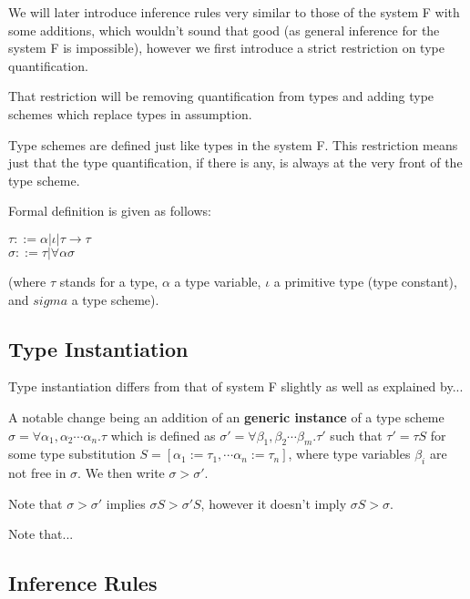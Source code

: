 We will later introduce inference rules very similar to those of the system F with some additions, which wouldn't sound that good (as general inference for the system F is impossible), however we first introduce a strict restriction on type quantification.

That restriction will be removing quantification from types and adding type schemes which replace types in assumption.

Type schemes are defined just like types in the system F. This restriction means just that the type quantification, if there is any, is always at the very front of the type scheme.

Formal definition is given as follows:

$\tau ::= \alpha | \iota | \tau \rightarrow \tau$ \\
$\sigma ::= \tau | \forall \alpha \sigma$

(where $\tau$ stands for a type, $\alpha$ a type variable, $\iota$ a primitive type (type constant), and $sigma$ a type scheme). %

\subsection{Type Instantiation}

Type instantiation differs from that of system F slightly as well as explained  by... %

A notable change being an addition of an \textbf{generic instance} of a type scheme $\sigma = \forall \alpha_1, \alpha_2 \cdots \alpha_n . \tau$ which is defined as $\sigma' = \forall \beta_1, \beta_2 \cdots \beta_m . \tau'$ such that
$\tau' = \tau S$ for some type substitution $S = [\alpha_1 := \tau_1, \cdots \alpha_n := \tau_n]$, where type variables $\beta_i$ are not free in $\sigma$. We then write $\sigma > \sigma'$.

Note that $\sigma > \sigma'$ implies $\sigma S > \sigma' S$, however it doesn't imply $\sigma S > \sigma$.

Note that... %

\subsection{Inference Rules}

